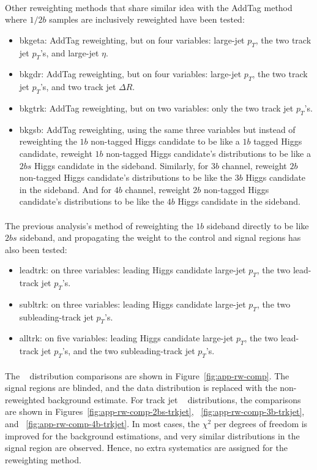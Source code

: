 \paragraph{}
Other reweighting methods that share similar idea with the AddTag method where $1/2b$ samples are inclusively reweighted have been tested:
\begin{itemize}
	\item bkgeta: AddTag reweighting, but on four variables: large-\R jet $p_{T}$, the two track jet $p_{T}$'s, and large-\R jet $\eta$.
	\item bkgdr: AddTag reweighting, but on four variables: large-\R jet $p_{T}$, the two track jet $p_{T}$'s, and two track jet $\Delta R$.
	\item bkgtrk: AddTag reweighting, but on two variables: only the two track jet $p_{T}$'s.
	\item bkgsb: AddTag reweighting, using the same three variables but instead of reweighting the $1b$ non-tagged Higgs candidate to be like a $1b$ tagged Higgs candidate, reweight $1b$ non-tagged Higgs candidate's distributions to be like a $2bs$ Higgs candidate in the sideband. Similarly, for $3b$ channel, reweight $2b$ non-tagged Higgs candidate's distributions to be like the $3b$ Higgs candidate in the sideband. And for $4b$ channel, reweight $2b$ non-tagged Higgs candidate's distributions to be like the $4b$ Higgs candidate in the sideband.
\end{itemize}

\paragraph{}
The previous analysis's method of reweighting the $1b$ sideband directly to be like $2bs$ sideband, and propagating the weight to the control and signal regions has also been tested:
\begin{itemize}
	\item leadtrk: on three variables: leading Higgs candidate large-\R jet $p_{T}$, the two lead-track jet $p_{T}$'s.
	\item subltrk: on three variables: leading Higgs candidate large-\R jet $p_{T}$, the two subleading-track jet $p_{T}$'s.
	\item alltrk: on five variables: leading Higgs candidate large-\R jet $p_{T}$, the two lead-track jet $p_{T}$'s, and the two subleading-track jet $p_{T}$'s.
\end{itemize}

\paragraph{}
The \mtwoJ~ distribution comparisons are shown in Figure~\ref{fig:app-rw-comp}. 
The signal regions are blinded, and the data distribution is replaced with the non-reweighted background estimate. 
For track jet \pt~ distributions, the comparisons are shown in Figures~\ref{fig:app-rw-comp-2bs-trkjet}, ~\ref{fig:app-rw-comp-3b-trkjet}, and ~\ref{fig:app-rw-comp-4b-trkjet}. 
In most cases, the $\chi^2$ per degrees of freedom is improved for the background estimations, and very similar distributions in the signal region are observed. 
Hence, no extra systematics are assigned for the reweighting method.

